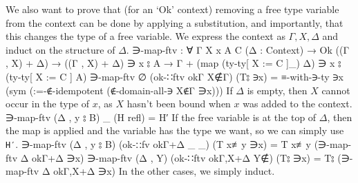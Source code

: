 \documentclass[logo,bsc,singlespacing,parskip,online]{infthesis}
\renewenvironment{code}{\mintedcopy[breaklines,breaksymbolleft=\;]{agda}}{\endmintedcopy}
\begin{document}
We also want to prove that (for an `Ok' context) removing a free type variable from the context can
be done by applying a substitution, and importantly, that this changes the type of a free variable.
We express the context as $\Gamma, X, \Delta$ and induct on the structure of $\Delta$.
\begin{code}
  ∋-map-ftv : ∀ {Γ X x A C} (Δ : Context)
    → Ok ((Γ , X) + Δ)
    → ((Γ , X) + Δ) ∋ x ⦂ A
    → Γ + (map (ty-ty[ X := C ]_) Δ) ∋ x ⦂ (ty-ty[ X := C ] A)
  ∋-map-ftv ∅ (ok-∷ftv okΓ X∉Γ) (T⦂ ∋x) =
    ≡-with-∋-ty ∋x
      (sym (:=-∉-idempotent (∉-domain-all-∋ X∉Γ ∋x)))
\end{code}
If $\Delta$ is empty, then $X$ cannot occur in the type of $x$, as $X$ hasn't been bound when $x$
was added to the context.
\begin{code}
  ∋-map-ftv (Δ , y ⦂ B) _ (H refl) = H′
\end{code}
If the free variable is at the top of $\Delta$, then the map is applied and the variable has the
type we want, so we can simply use \texttt{H′}.
\begin{code}
  ∋-map-ftv (Δ , y ⦂ B) (ok-∷fv okΓ+Δ _ _) (T x≢y ∋x) =
    T x≢y (∋-map-ftv Δ okΓ+Δ ∋x)
  ∋-map-ftv (Δ , Y) (ok-∷ftv okΓ,X+Δ Y∉) (T⦂ ∋x) =
    T⦂ (∋-map-ftv Δ okΓ,X+Δ ∋x)
\end{code}
In the other cases, we simply induct.
\end{document}
